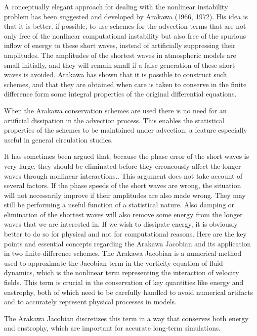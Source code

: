 A conceptually elegant approach for dealing with the nonlinear instability problem has been suggested and developed by Arakawa (1966, 1972). His idea is that it is better, if possible, to use schemes for the advection terms that are not only free of the nonlinear computational instability but also free of the spurious inflow of energy to these short waves, instead of artificially suppressing their amplitudes. The amplitudes of the shortest waves in atmospheric models are small initially, and they will remain small if a false generation of these short waves is avoided. Arakawa has shown that it is possible to construct such schemes, and that they are obtained when care is taken to conserve in the finite difference form some integral properties of the original differential equations.

When the Arakawa conservation schemes are used there is no need for an artificial dissipation in the advection process. This enables the statistical properties of the schemes to be maintained under advection, a feature especially useful in general circulation studies.

It has sometimes been argued that, because the phase error of the short waves is very large, they should be eliminated before they erroneously affect the longer waves through nonlinear interactions.. This argument does not take account of several factors. If the phase speeds of the short waves are wrong, the situation will not necessarily improve if their amplitudes are also made wrong. They may still be performing a useful function of a statistical nature. Also damping or elimination of the shortest waves will also remove some energy from the longer waves that we are interested in. If we wish to dissipate energy, it is obviously better to do so for physical and not for computational reasons.
Here are the key points and essential concepts regarding the Arakawa Jacobian and its application in two finite-difference schemes. The Arakawa Jacobian is a numerical method used to approximate the Jacobian term in the vorticity equation of fluid dynamics, which is the nonlinear term representing the interaction of velocity fields. This term is crucial in the conservation of key quantities like energy and enstrophy, both of which need to be carefully handled to avoid numerical artifacts and to accurately represent physical processes in models.



The Arakawa Jacobian discretizes this term in a way that conserves both energy and enstrophy, which are important for accurate long-term simulations.

